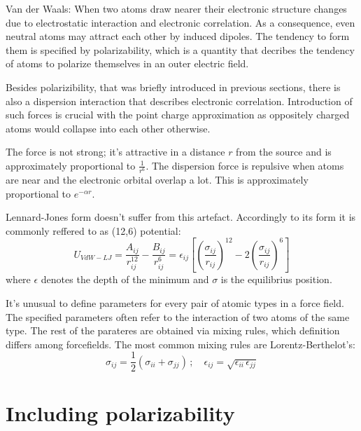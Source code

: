   Van der Waals: When two atoms draw nearer their electronic structure changes due to electrostatic interaction and electronic correlation. As a consequence, even neutral atoms may attract each other by induced dipoles. The tendency to form them is specified by polarizability, which is a quantity that decribes the tendency of atoms to polarize themselves in an outer electric field. 

  Besides polarizibility, that was briefly introduced in previous sections, there is also a dispersion interaction that describes electronic correlation. Introduction of such forces is crucial with the point charge approximation as oppositely charged atoms would collapse into each other otherwise.

  The force is not strong; it's attractive in a distance $r$ from the source and is approximately proportional to $\frac{1}{r^6}$. The dispersion force is repulsive when atoms are near and the electronic orbital overlap a lot. This is approximately proportional to $ e^{-\alpha r} $.


  Lennard-Jones form doesn't suffer from this artefact. Accordingly to its form it is commonly reffered to as (12,6) potential:
\begin{equation}
   U_{VdW-LJ} =  \frac{A_{ij}}{r_{ij}^{12}} - \frac{B_{ij}}{r_{ij}^6} = \epsilon _{ij} \left [ \left (\frac{\sigma _{ij}}{r_{ij}} \right )^{12} - 2 \left ( \frac{\sigma _{ij}}{r_{ij}} \right )^6 \right ]
\end{equation}
  where $\epsilon$ denotes the depth of the minimum and $\sigma$ is the equilibrius position. 

  It's unusual to define parameters for every pair of atomic types in a force field. The specified parameters often refer to the interaction of two atoms of the same type. The rest of the parateres are obtained via mixing rules, which definition differs among forcefields. The most common mixing rules are Lorentz-Berthelot's:
\begin{equation}
 \sigma _{ij} = \frac{1}{2} (\sigma _{ii} + \sigma _{jj}) \, ; \quad \epsilon _{ij} = \sqrt{\epsilon _{ii} \, \epsilon _{jj}} 
\end{equation}









\section{Including polarizability}

